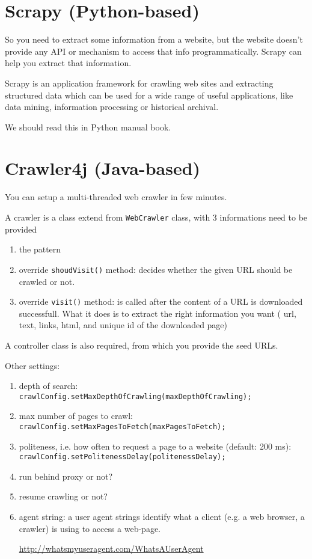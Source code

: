 \section{Scrapy (Python-based)}
\label{sec:Scrapy}

So you need to extract some information from a website, but the website doesn't
provide any API or mechanism to access that info programmatically. Scrapy can
help you extract that information.

Scrapy is an application framework for crawling web sites and extracting
structured data which can be used for a wide range of useful applications, like
data mining, information processing or historical archival.


We should read this in Python manual book.


\section{Crawler4j (Java-based)}

You can setup a multi-threaded web crawler in few minutes.

A crawler is a class extend from \verb!WebCrawler! class, with 3 informations need to be provided
\begin{enumerate}
  \item the pattern
  \item override \verb!shoudVisit()! method: decides whether the given URL should be crawled or not.
  \item override \verb!visit()! method: is called after the content of a URL is downloaded successfull. What it does is
  to extract the right information you want ( url, text, links, html, and unique id of the downloaded page)
\end{enumerate}

A controller class is also required, from which you provide the seed URLs.

Other settings:
\begin{enumerate}
  \item depth of search: \verb!crawlConfig.setMaxDepthOfCrawling(maxDepthOfCrawling);!
  
  \item max number of pages to crawl: \verb!crawlConfig.setMaxPagesToFetch(maxPagesToFetch);!
  
  \item politeness, i.e. how often to request a page to a website (default: 200 ms): \verb!crawlConfig.setPolitenessDelay(politenessDelay);!
  
  \item run behind proxy or not?
  
  \item resume crawling or not?
  
  \item agent string: a user agent strings identify what a client (e.g. a web browser, a crawler) is using to access a web-page.
  
  \url{http://whatsmyuseragent.com/WhatsAUserAgent}
\end{enumerate}

